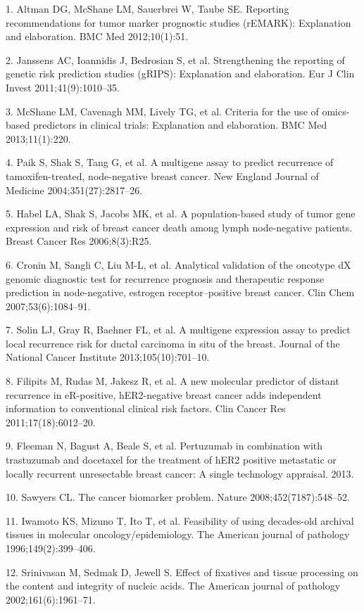 \documentclass[11pt]{article}
\begin{document}
1. Altman DG, McShane LM, Sauerbrei W, Taube SE. Reporting
recommendations for tumor marker prognostic studies (rEMARK):
Explanation and elaboration. BMC Med 2012;10(1):51.

2. Janssens AC, Ioannidis J, Bedrosian S, et al. Strengthening the
reporting of genetic risk prediction studies (gRIPS): Explanation and
elaboration. Eur J Clin Invest 2011;41(9):1010--35.

3. McShane LM, Cavenagh MM, Lively TG, et al. Criteria for the use of
omics-based predictors in clinical trials: Explanation and elaboration.
BMC Med 2013;11(1):220.

4. Paik S, Shak S, Tang G, et al. A multigene assay to predict
recurrence of tamoxifen-treated, node-negative breast cancer. New
England Journal of Medicine 2004;351(27):2817--26.

5. Habel LA, Shak S, Jacobs MK, et al. A population-based study of tumor
gene expression and risk of breast cancer death among lymph
node-negative patients. Breast Cancer Res 2006;8(3):R25.

6. Cronin M, Sangli C, Liu M-L, et al. Analytical validation of the
oncotype dX genomic diagnostic test for recurrence prognosis and
therapeutic response prediction in node-negative, estrogen
receptor--positive breast cancer. Clin Chem 2007;53(6):1084--91.

7. Solin LJ, Gray R, Baehner FL, et al. A multigene expression assay to
predict local recurrence risk for ductal carcinoma in situ of the
breast. Journal of the National Cancer Institute 2013;105(10):701--10.

8. Filipits M, Rudas M, Jakesz R, et al. A new molecular predictor of
distant recurrence in eR-positive, hER2-negative breast cancer adds
independent information to conventional clinical risk factors. Clin
Cancer Res 2011;17(18):6012--20.

9. Fleeman N, Bagust A, Beale S, et al. Pertuzumab in combination with
trastuzumab and docetaxel for the treatment of hER2 positive metastatic
or locally recurrent unresectable breast cancer: A single technology
appraisal. 2013.

10. Sawyers CL. The cancer biomarker problem. Nature
2008;452(7187):548--52.

11. Iwamoto KS, Mizuno T, Ito T, et al. Feasibility of using decades-old
archival tissues in molecular oncology/epidemiology. The American
journal of pathology 1996;149(2):399--406.

12. Srinivasan M, Sedmak D, Jewell S. Effect of fixatives and tissue
processing on the content and integrity of nucleic acids. The American
journal of pathology 2002;161(6):1961--71.
\end{document}
